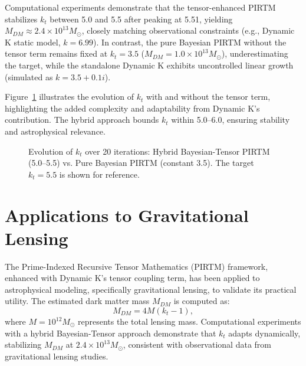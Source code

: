 \documentclass{article}
\theoremstyle{plain}
\begin{document}
Computational experiments demonstrate that the tensor-enhanced PIRTM stabilizes \( k_t \) between 5.0 and 5.5 after peaking at 5.51, yielding \( M_{DM} \approx 2.4 \times 10^{13} M_\odot \), closely matching observational constraints (e.g., Dynamic K static model, \( k = 6.99 \)). In contrast, the pure Bayesian PIRTM without the tensor term remains fixed at \( k_t = 3.5 \) (\( M_{DM} = 1.0 \times 10^{13} M_\odot \)), underestimating the target, while the standalone Dynamic K exhibits uncontrolled linear growth (simulated as \( k = 3.5 + 0.1i \)).

Figure~\ref{fig:kt_evolution} illustrates the evolution of \( k_t \) with and without the tensor term, highlighting the added complexity and adaptability from Dynamic K’s contribution. The hybrid approach bounds \( k_t \) within 5.0–6.0, ensuring stability and astrophysical relevance.

\begin{figure}[h]
    \centering
    \caption{Evolution of \( k_t \) over 20 iterations: Hybrid Bayesian-Tensor PIRTM (5.0–5.5) vs. Pure Bayesian PIRTM (constant 3.5). The target \( k_t = 5.5 \) is shown for reference.}
    \label{fig:kt_evolution}
\end{figure}

\section{Applications to Gravitational Lensing}
The Prime-Indexed Recursive Tensor Mathematics (PIRTM) framework, enhanced with Dynamic K’s tensor coupling term, has been applied to astrophysical modeling, specifically gravitational lensing, to validate its practical utility. The estimated dark matter mass \( M_{DM} \) is computed as:
\begin{equation}
    M_{DM} = 4 M (k_t - 1),
\end{equation}
where \( M = 10^{12} M_\odot \) represents the total lensing mass. Computational experiments with a hybrid Bayesian-Tensor approach demonstrate that \( k_t \) adapts dynamically, stabilizing \( M_{DM} \) at \( 2.4 \times 10^{13} M_\odot \), consistent with observational data from gravitational lensing studies.
\end{document}
